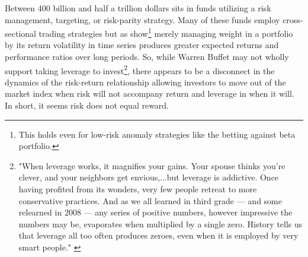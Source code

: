 \noindent %
Between 400 billion and half a trillion dollars sits in funds utilizing a risk management, targeting, or risk-parity strategy. \citep{cao_risk_2016,verma_volatility-targeting_2018} Many of these funds employ cross-sectional trading strategies but as \citet{moreira_volatility-managed_2017} show\footnote{This holds even for low-risk anomaly strategies like the \citet{frazzini_betting_2014} betting against beta portfolio.} merely managing weight in a portfolio by its return volatility in time series produces greater expected returns and performance ratios over long periods. So, while Warren Buffet may not wholly support taking leverage to invest\footnote{"When leverage works, it magnifies your gains. Your spouse thinks you're clever, and your neighbors get envious,...but leverage is addictive. Once having profited from its wonders, very few people retreat to more conservative practices. And as we all learned in third grade — and some relearned in 2008 — any series of positive numbers, however impressive the numbers may be, evaporates when multiplied by a single zero. History tells us that leverage all too often produces zeroes, even when it is employed by very smart people." \citep{noauthor_warren_nodate}}, there appears to be a disconnect in the dynamics of the risk-return relationship allowing investors to move out of the market index when risk will not accompany return and leverage in when it will. In short, it seems risk does not equal reward. %
